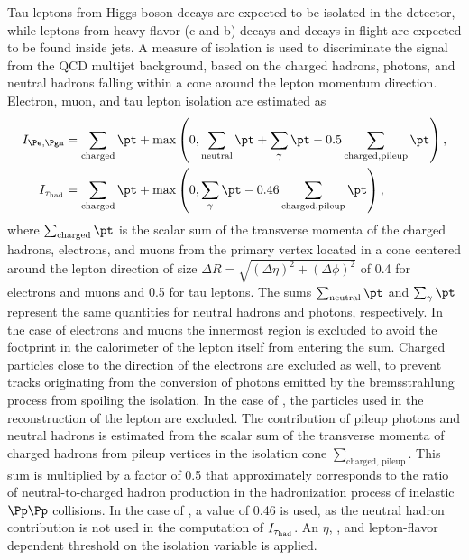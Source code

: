 Tau leptons from Higgs boson decays are expected to be isolated in the detector, while leptons from heavy-flavor (c and b) decays and decays in flight are expected to be found inside jets. A measure of isolation is used to discriminate the signal from the QCD multijet background, based on the charged hadrons, photons, and neutral hadrons falling within a cone around the lepton momentum direction.
Electron, muon, and tau lepton isolation are estimated as
\begin{equation}\begin{aligned}
I_{\Pe,\Pgm} &=  \sum_{\rm charged}  \pt + \text{max}\left( 0, \sum_{\rm neutral}  \pt
                                        +  \sum_{\gamma} {\pt} - 0.5 \sum_{\rm charged, pileup} \pt  \right ), \\
I_{\Tau} &=  \sum_{\rm charged}  \pt + \text{max}\left( 0, \sum_{\gamma} {\pt} - 0.46 \sum_{\rm charged, pileup} \pt  \right ),
\label{eq:reconstruction_isolation}
\end{aligned}\end{equation}
where $\sum_\text{charged}\pt$ is the scalar sum of the transverse momenta of the charged hadrons, electrons, and muons from the primary vertex located in a cone centered around the lepton direction of size $\Delta R = \sqrt{(\Delta\eta)^2+(\Delta\phi)^2}$ of 0.4 for electrons and muons and 0.5 for tau leptons.
The sums $\sum_\text{neutral}\pt$ and $\sum_{\gamma} \pt$ represent the same quantities for neutral hadrons and photons, respectively. In the case of electrons and muons the innermost region is excluded
to avoid the footprint in the calorimeter of the lepton itself from entering the sum.
Charged particles close to the direction of the electrons are excluded as well, to prevent tracks originating from the conversion of photons emitted by the bremsstrahlung process from spoiling the isolation. In the case of \Tau, the particles used in the reconstruction of the lepton are excluded. The contribution of pileup photons and neutral hadrons
is estimated from the scalar sum of the transverse momenta of charged hadrons from pileup vertices in the isolation cone $\sum_\text{charged, pileup}$. This sum is multiplied by a factor of 0.5 that approximately corresponds to the ratio of neutral-to-charged hadron production in the hadronization process of inelastic $\Pp\Pp$ collisions. In the case of \Tau, a value of 0.46 is used, as the neutral hadron contribution is not used in the computation of $I_{\tau_{\rm had}}$. An $\eta$, \pt, and lepton-flavor dependent threshold on the isolation variable is applied.

